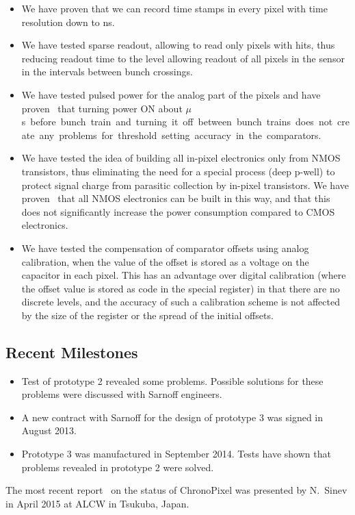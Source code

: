 \begin{itemize}
    \item We have proven that we can record time stamps in every pixel with time resolution down to \unit[150]{ns}.
    \item We have tested sparse readout, allowing to read only pixels with hits, thus reducing readout time to the level allowing readout of all pixels in the sensor in the intervals between bunch crossings.
    \item We have tested pulsed power for the analog part of the pixels and have proven~\cite{sinev:Chronopix:FirstPrototype} that turning power ON about \unit[100]{$\mu$s} before bunch train and turning it off between bunch trains does not create any problems for threshold setting accuracy in the comparators.
    \item We have tested the idea of building all in-pixel electronics only from NMOS transistors, thus eliminating the need for a special process (deep p-well) to protect signal charge from parasitic collection by in-pixel transistors. We have proven~\cite{sinev:Chronopixel:RnDstatus2013} that all NMOS electronics can be built in this way, and that this does not significantly increase the power consumption compared to CMOS electronics.
    \item We have tested the compensation of comparator offsets using analog calibration, when the value of the offset is stored as a voltage on the capacitor in each pixel. This has an advantage over digital calibration (where the offset value is stored as code in the special register) in that there are no discrete levels, and the accuracy of such a calibration scheme is not affected by the size of the register or the spread of the initial offsets.
\end{itemize}
\subsection{Recent Milestones}
\begin{itemize}
    \item Test of prototype 2 revealed some problems. Possible solutions for these problems were discussed with Sarnoff engineers.
    \item A new contract with Sarnoff for the design of prototype 3 was signed in August 2013.
    \item Prototype 3 was manufactured in September 2014. Tests have shown that problems revealed in prototype 2 were solved.
\end{itemize}
The most recent report~\cite{sinev:Chronopixel:status2014} on the status of ChronoPixel was presented by N.~Sinev in April 2015 at ALCW in Tsukuba, Japan.

